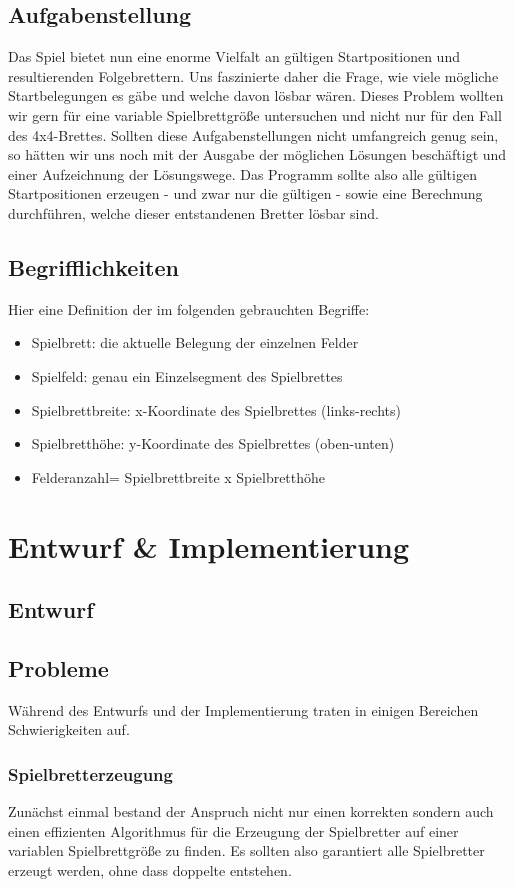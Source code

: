\documentclass[
	12pt,
	a4paper,
	BCOR10mm,
	DIV14,
	listof=totoc,
	bibliography=totoc,
	headsepline
]{scrreprt}
\begin{document}
\section{Aufgabenstellung}

Das Spiel bietet nun eine enorme Vielfalt an gültigen Startpositionen und resultierenden Folgebrettern.
Uns faszinierte daher die Frage, wie viele mögliche Startbelegungen es gäbe und welche davon lösbar wären.
Dieses Problem wollten wir gern für eine variable Spielbrettgröße untersuchen und nicht nur für den Fall des 4x4-Brettes.
Sollten diese Aufgabenstellungen nicht umfangreich genug sein, so hätten wir uns noch mit der Ausgabe der möglichen Lösungen beschäftigt und einer Aufzeichnung der Lösungswege.
Das Programm sollte also alle gültigen Startpositionen erzeugen - und zwar nur die gültigen - sowie eine Berechnung durchführen, welche dieser entstandenen Bretter lösbar sind.


\section{Begrifflichkeiten}
Hier eine Definition der im folgenden gebrauchten Begriffe:
\begin{itemize}
	\item Spielbrett: die aktuelle Belegung der einzelnen Felder
	\item Spielfeld: genau ein Einzelsegment des Spielbrettes
	\item Spielbrettbreite: x-Koordinate des Spielbrettes (links-rechts)
	\item Spielbretthöhe: y-Koordinate des Spielbrettes (oben-unten)
	\item Felderanzahl= Spielbrettbreite x Spielbretthöhe
\end{itemize}


\chapter{Entwurf \& Implementierung}
\label{Entwurf}

\section{Entwurf}
\section{Probleme}
Während des Entwurfs und der Implementierung traten in einigen Bereichen Schwierigkeiten auf.
\subsection{Spielbretterzeugung}
Zunächst einmal bestand der Anspruch nicht nur einen korrekten sondern auch einen effizienten Algorithmus für die Erzeugung der Spielbretter auf einer variablen Spielbrettgröße zu finden.
Es sollten also garantiert alle Spielbretter erzeugt werden, ohne dass doppelte entstehen.
\end{document}
